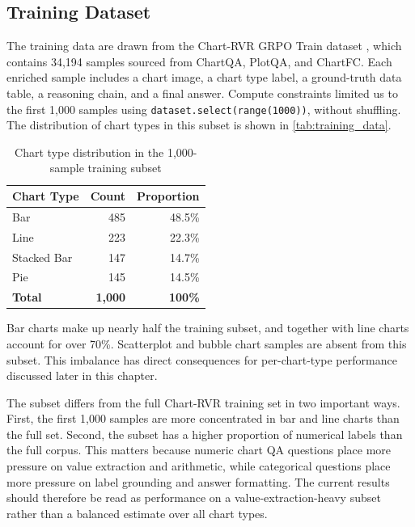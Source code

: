 \documentclass{iutbscthesis}
\begin{document}
\subsection{Training Dataset}

The training data are drawn from the Chart-RVR GRPO Train dataset \cite{sinha2025chartrvr}, which contains 34,194 samples sourced from ChartQA, PlotQA, and ChartFC. Each enriched sample includes a chart image, a chart type label, a ground-truth data table, a reasoning chain, and a final answer. Compute constraints limited us to the first 1,000 samples using \texttt{dataset.select(range(1000))}, without shuffling. The distribution of chart types in this subset is shown in \autoref{tab:training_data}.

\begin{table}[H]
    \centering
    \begin{tabular}{lrr}
        \toprule
        Chart Type & Count & Proportion \\
        \midrule
        Bar         & 485 & 48.5\% \\
        Line        & 223 & 22.3\% \\
        Stacked Bar & 147 & 14.7\% \\
        Pie         & 145 & 14.5\% \\
        \midrule
        \textbf{Total} & \textbf{1,000} & \textbf{100\%} \\
        \bottomrule
    \end{tabular}
    \caption{Chart type distribution in the 1,000-sample training subset}
    \label{tab:training_data}
\end{table}

Bar charts make up nearly half the training subset, and together with line charts account for over 70\%. Scatterplot and bubble chart samples are absent from this subset. This imbalance has direct consequences for per-chart-type performance discussed later in this chapter.

The subset differs from the full Chart-RVR training set in two important ways. First, the first 1,000 samples are more concentrated in bar and line charts than the full set. Second, the subset has a higher proportion of numerical labels than the full corpus. This matters because numeric chart QA questions place more pressure on value extraction and arithmetic, while categorical questions place more pressure on label grounding and answer formatting. The current results should therefore be read as performance on a value-extraction-heavy subset rather than a balanced estimate over all chart types.
\end{document}
